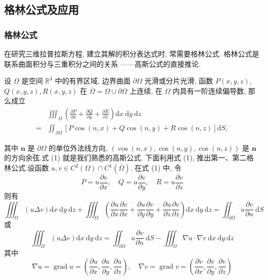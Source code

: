 \subsection{格林公式及应用 }
 \subsubsection{格林公式}
 
在研究三维拉普拉斯方程, 建立其解的积分表达式时, 常需要格林公式. 格林公式是联系曲面积分与三重积分之间的关系 ——高斯公式的直接推论.

设 $ \Omega $ 是空间 $ \mathbb{R}^{3} $ 中的有界区域, 边界曲面 $ \partial \Omega $ 光滑或分片光滑, 函数 $ P(x, y, z) $, $ Q(x, y, z), R(x, y, z) $ 在 $ \overline{\Omega}=\Omega \cup \partial \Omega $ 上连续, 在 $ \Omega $ 内具有一阶连续偏导数, 那么成立
\begin{equation*}
    \begin{aligned}
& \iiint_{\Omega}\left(\frac{\partial P}{\partial x}+\frac{\partial Q}{\partial y}+\frac{\partial R}{\partial z}\right) \mathrm{d} x \mathrm{~d} y \mathrm{~d} z \\
= & \iint_{\partial \Omega}[P \cos (n, x)+Q \cos (n, y)+R \cos (n, z)] \mathrm{d} S,
\end{aligned}\tag{1}
\end{equation*}

其中 $ \boldsymbol{n} $ 是 $ \partial \Omega $ 的单位外法线方向, $ (\cos (n, x), \cos (n, y), \cos (n, z)) $ 是 $ \boldsymbol{n} $ 的方向余弦.式 (1) 就是我们熟悉的高斯公式. 下面利用式 (1), 推出第一、第二格林公式.设函数 $ u, v \in C^{2}(\Omega) \cap C^{1}(\bar{\Omega}) $. 在式 (1) 中, 令
$$
P=u \frac{\partial v}{\partial x}, \quad Q=u \frac{\partial v}{\partial y}, \quad R=u \frac{\partial v}{\partial z}
$$
则有
$$
\iiint_{\Omega}(u \Delta v) \mathrm{d} x \mathrm{~d} y \mathrm{~d} z+\iiint_{\Omega}\left(\frac{\partial u}{\partial x} \frac{\partial v}{\partial x}+\frac{\partial u}{\partial y} \frac{\partial v}{\partial y}+\frac{\partial u}{\partial z} \frac{\partial v}{\partial z}\right) \mathrm{d} x \mathrm{~d} y \mathrm{~d} z=\iint_{\partial \Omega} u \frac{\partial v}{\partial n} \mathrm{~d} S
$$
或
\begin{equation*}
    \iiint_{\Omega}(u \Delta v) \mathrm{d} x \mathrm{~d} y \mathrm{~d} z=\iint_{\partial \Omega} u \frac{\partial v}{\partial n} \mathrm{~d} S-\iiint_{\Omega} \nabla u \cdot \nabla v \mathrm{~d} x \mathrm{~d} y \mathrm{~d} z \tag{2}
\end{equation*}
其中
$$
\nabla u=\operatorname{grad} u=\left(\frac{\partial u}{\partial x}, \frac{\partial u}{\partial y}, \frac{\partial u}{\partial z}\right), \quad \nabla v=\operatorname{grad} v=\left(\frac{\partial v}{\partial x}, \frac{\partial v}{\partial y}, \frac{\partial v}{\partial z}\right)
$$

